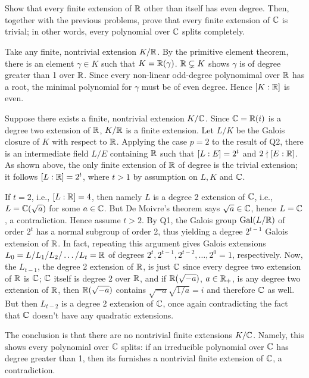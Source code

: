 \documentclass[12pt]{article}
\begin{document}
\section{} 
Show that every finite extension of $\mathbb{R}$ other than itself has even degree. 
Then, together with the previous problems, prove that every finite extension of $\mathbb{C}$ is trivial; 
in other words, every polynomial over $\mathbb{C}$ splits completely.  

\noindent \dotfill 

Take any finite, nontrivial extension $K / \mathbb{R}$. 
By the primitive element theorem, there is an element $\gamma \in K$ such that $K = \mathbb{R}(\gamma)$. 
$\mathbb{R} \subsetneq K$ shows $\gamma$ is of degree greater than 1 over $\mathbb{R}$. 
Since every non-linear odd-degree polynomimal over $\mathbb{R}$ has a root, the minimal polynomial for $\gamma$ must be of even degree. 
Hence $[K : \mathbb{R}]$ is even. 

Suppose there exists a finite, nontrivial extension $K / \mathbb{C}$. 
Since $\mathbb{C} = \mathbb{R}(i)$ is a degree two extension of $\mathbb{R}$, $K / \mathbb{R}$ is a finite extension. 
Let $L / K$ be the Galois closure of $K$ with respect to $\mathbb{R}$. 
Applying the case $p = 2$ to the result of Q2, there is an intermediate field $L / E$ containing $\mathbb{R}$ such that $[L : E] = 2^{t}$ and $2 \nmid [E : \mathbb{R}]$. 
As shown above, the only finite extension of $\mathbb{R}$ of degree is the trivial extension; 
it follows $[L : \mathbb{R}] = 2^t$, where $t > 1$ by assumption on $L, K$ and $\mathbb{C}$. 

If $t = 2$, i.e., $[L : \mathbb{R}] = 4$, then namely $L$ is a degree 2 extension of $\mathbb{C}$, i.e., 
$L = \mathbb{C}(\sqrt{a})$ for some $a \in \mathbb{C}$. 
But De Moivre's theorem says $\sqrt{a} \in \mathbb{C}$, hence $L = \mathbb{C}$, a contradiction. 
Hence assume $t > 2$.  
By Q1, the Galois group $\text{Gal}(L / \mathbb{R})$ of order $2^{t}$ has a normal subgroup of order 2, thus yielding a degree $2^{t - 1}$ Galois extension of $\mathbb{R}$. 
In fact, repeating this argument gives Galois extensions $L_0 = L / L_1 / L_2 / \ldots / L_{t} = \mathbb{R}$ of degrees $2^t, 2^{t - 1}, 2^{t - 2}, \ldots, 2^{0} = 1$, respectively. 
Now, the $L_{t - 1}$, the degree 2 extension of $\mathbb{R}$, is just $\mathbb{C}$ since every degree two extension of $\mathbb{R}$ is $\mathbb{C}$; 
$\mathbb{C}$ itself is degree 2 over $\mathbb{R}$, and if $\mathbb{R}(\sqrt{-a})$, $a \in \mathbb{R}_{+}$, is any degree two extension of $\mathbb{R}$, then $\mathbb{R}(\sqrt{-a})$ contains $\sqrt{-a} \sqrt{1 / a} = i$ and therefore $\mathbb{C}$ as well. 
But then $L_{t - 2}$ is a degree 2 extension of $\mathbb{C}$, once again contradicting the fact that $\mathbb{C}$ doesn't have any quadratic extensions. 

The conclusion is that there are no nontrivial finite extensions $K / \mathbb{C}$. 
Namely, this shows every polynomial over $\mathbb{C}$ splits: 
if an irreducible polynomial over $\mathbb{C}$ has degree greater than 1, then its furnishes a nontrivial finite extension of $\mathbb{C}$, a contradiction. 
\end{document}
